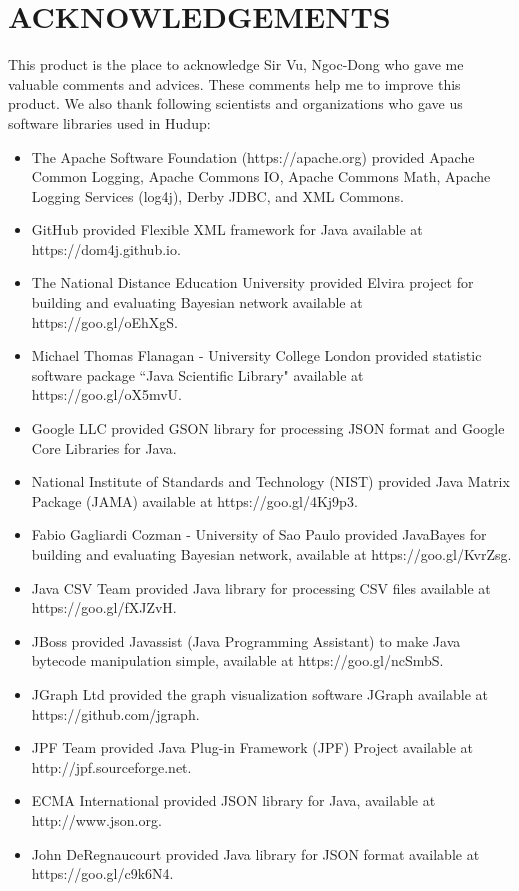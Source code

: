 \documentclass[a4paper,twoside]{article}
\begin{document}
\section*{\uppercase{Acknowledgements}}
\noindent This product is the place to acknowledge Sir Vu, Ngoc-Dong who gave me valuable comments and advices. These comments help me to improve this product. We also thank following scientists and organizations who gave us software libraries used in Hudup:
\begin{itemize}
\item The Apache Software Foundation (https://apache.org) provided Apache Common Logging, Apache Commons IO, Apache Commons Math, Apache Logging Services (log4j), Derby JDBC, and XML Commons.
\item GitHub provided Flexible XML framework for Java available at https://dom4j.github.io.
\item The National Distance Education University provided Elvira project for building and evaluating Bayesian network available at https://goo.gl/oEhXgS.
\item Michael Thomas Flanagan - University College London provided statistic software package ``Java Scientific Library" available at https://goo.gl/oX5mvU.
\item Google LLC provided GSON library for processing JSON format and Google Core Libraries for Java.
\item National Institute of Standards and Technology (NIST) provided Java Matrix Package (JAMA) available at https://goo.gl/4Kj9p3.
\item Fabio Gagliardi Cozman - University of Sao Paulo provided JavaBayes for building and evaluating Bayesian network, available at https://goo.gl/KvrZsg.
\item Java CSV Team provided Java library for processing CSV files available at https://goo.gl/fXJZvH.
\item JBoss provided Javassist (Java Programming Assistant) to make Java bytecode manipulation simple, available at https://goo.gl/ncSmbS.
\item JGraph Ltd provided the graph visualization software JGraph available at https://github.com/jgraph.
\item JPF Team provided Java Plug-in Framework (JPF) Project available at http://jpf.sourceforge.net.
\item ECMA International provided JSON library for Java, available at http://www.json.org.
\item John DeRegnaucourt provided Java library for JSON format available at https://goo.gl/c9k6N4.

\end{itemize}
\end{document}
